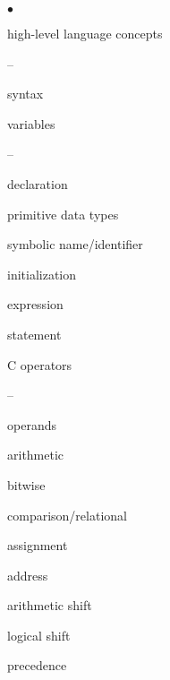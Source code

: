\begin{minipage}[t]{2.85in}
\begin{list}{$\bullet$}{\setlength{\itemsep}{0pt}\setlength{\parskip}{0pt}%
\setlength{\topsep}{0pt}\setlength{\partopsep}{0pt}\setlength{\parsep}{0pt}}

\item{high-level language concepts
\begin{list}{--}{\setlength{\itemsep}{0pt}\setlength{\parskip}{0pt}%
\setlength{\topsep}{0pt}\setlength{\partopsep}{0pt}\setlength{\parsep}{0pt}}
\item syntax
\item{variables
\begin{list}{--}{\setlength{\itemsep}{0pt}\setlength{\parskip}{0pt}%
\setlength{\topsep}{0pt}\setlength{\partopsep}{0pt}\setlength{\parsep}{0pt}}
\item declaration
\item primitive data types
\item symbolic name/identifier
\item initialization
\end{list}
}
\item expression
\item statement
\end{list}
}

\item{C operators
\begin{list}{--}{\setlength{\itemsep}{0pt}\setlength{\parskip}{0pt}%
\setlength{\topsep}{0pt}\setlength{\partopsep}{0pt}\setlength{\parsep}{0pt}}
\item operands
\item arithmetic
\item bitwise
\item comparison/relational
\item assignment
\item address
\item arithmetic shift
\item logical shift
\item precedence
\end{list}
}


\end{list}
\end{minipage}

